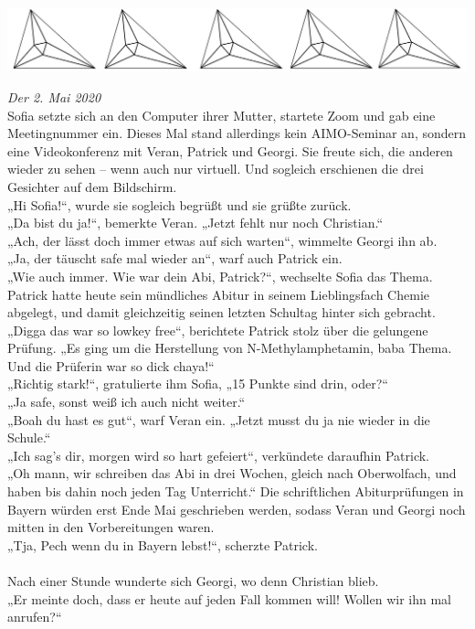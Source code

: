 \documentclass[oneside]{memoir}
\newcommand{\parasep}{
\bigskip
\bigskip
\begin{center} 
   \includegraphics[scale=.08]{parasep5.jpg} 
\end{center}
\bigskip
\bigskip
}
\begin{document}
\parasep
     \textit{Der 2. Mai 2020} \\
     
Sofia setzte sich an den Computer ihrer Mutter, startete Zoom und gab eine Meetingnummer ein. Dieses Mal stand allerdings kein AIMO-Seminar an, sondern eine Videokonferenz mit Veran, Patrick und Georgi. Sie freute sich, die anderen wieder zu sehen – wenn auch nur virtuell. Und sogleich erschienen die drei Gesichter auf dem Bildschirm. \\
„Hi Sofia!“, wurde sie sogleich begrüßt und sie grüßte zurück. \\
„Da bist du ja!“, bemerkte Veran. „Jetzt fehlt nur noch Christian.“ \\
„Ach, der lässt doch immer etwas auf sich warten“, wimmelte Georgi ihn ab. \\
„Ja, der täuscht safe mal wieder an“, warf auch Patrick ein. \\
„Wie auch immer. Wie war dein Abi, Patrick?“, wechselte Sofia das Thema. Patrick hatte 
heute sein mündliches Abitur in seinem Lieblingsfach Chemie abgelegt, und damit 
gleichzeitig seinen letzten Schultag hinter sich gebracht. \\
„Digga das war so lowkey free“, berichtete Patrick stolz über die gelungene Prüfung. „Es ging um die Herstellung von N-Methylamphetamin, baba Thema. Und die Prüferin war so dick chaya!“ \\
„Richtig stark!“, gratulierte ihm Sofia, „15 Punkte sind drin, oder?“ \\
„Ja safe, sonst weiß ich auch nicht weiter.“ \\
„Boah du hast es gut“, warf Veran ein. „Jetzt musst du ja nie wieder in die Schule.“ \\
„Ich sag's dir, morgen wird so hart gefeiert“, verkündete daraufhin Patrick. \\
„Oh mann, wir schreiben das Abi in drei Wochen, gleich nach Oberwolfach, und haben bis 
dahin noch jeden Tag Unterricht.“ Die schriftlichen Abiturprüfungen in Bayern würden erst 
Ende Mai geschrieben werden, sodass Veran und Georgi noch mitten in den Vorbereitungen waren. \\
„Tja, Pech wenn du in Bayern lebst!“, scherzte Patrick. \\ \\
Nach einer Stunde wunderte sich Georgi, wo denn Christian blieb. \\
„Er meinte doch, dass er heute auf jeden Fall kommen will! Wollen wir ihn mal anrufen?“ \\
\end{document}
